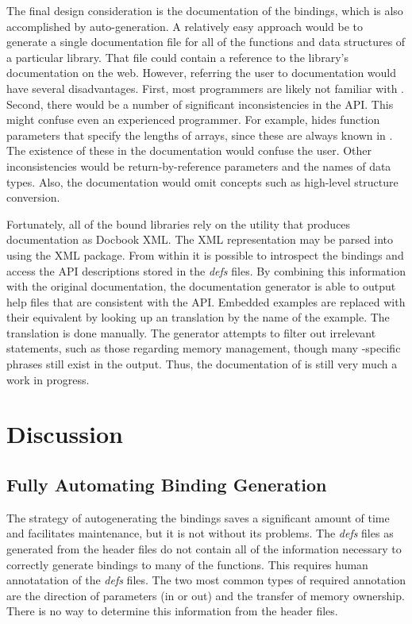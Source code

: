 \documentclass[article]{jss}
\begin{document}
The final design consideration is the documentation of the bindings,
which is also accomplished by auto-generation. A relatively easy approach
would be to generate a single documentation file for all of
the functions and data structures of a particular library. That file could
contain a reference to the library's  documentation on the web. 
However, referring the user to  documentation would have
several disadvantages. First, most  programmers are likely not
familiar with . Second, there would be a
number of significant inconsistencies in the API. This might confuse
even an experienced  programmer.
For example,  hides function parameters that specify the lengths of 
arrays, since these are always known in . The existence of these in 
the  documentation would confuse the  user. Other 
inconsistencies would be return-by-reference parameters and the names of data 
types. Also, the  documentation would omit concepts such as
high-level structure conversion.

Fortunately, all of the bound libraries rely on the  utility that 
produces documentation as Docbook XML. The XML representation may be
parsed into  using the XML package. From within  it is possible
to introspect the bindings and access the API descriptions stored
in the \emph{defs} files. By combining this information with the original 
documentation, the documentation generator is able to output  help
files that are consistent with the  API. Embedded  
examples are replaced with their  equivalent by looking up
an  translation by the name of the example. The translation is
done manually. The generator attempts to filter out irrelevant statements, 
such as those  regarding memory management, though many -specific 
phrases still exist in the output. Thus, the documentation of 
is still very much a work in progress.

\section{Discussion}

\subsection{Fully Automating Binding Generation}

The strategy of autogenerating the bindings saves a significant amount
of time and facilitates maintenance, but it is not without its problems.
The \emph{defs} files as generated from the header files do not contain all
of the information necessary to correctly generate bindings to many
of the  functions. This requires human annotatation of the \emph{defs}
files.  The two most common types of required annotation are the direction
of parameters (in or out) and the transfer of memory ownership. There is no
way to determine this information from the header files. 
\end{document}
